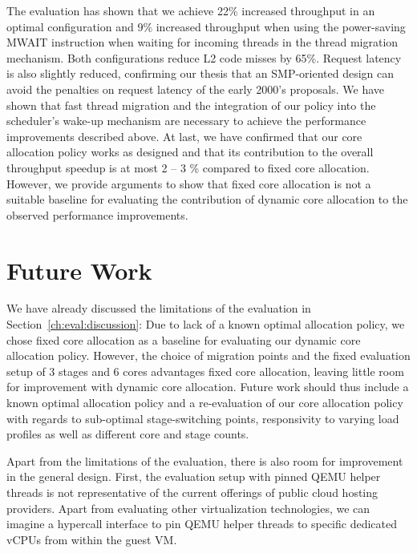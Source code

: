 \documentclass[12pt,a4paper]{book}
\begin{document}
The evaluation has shown that we achieve 22\% increased throughput in an optimal configuration and 9\% increased throughput when using the power-saving MWAIT instruction when waiting for incoming threads in the thread migration mechanism.
Both configurations reduce L2 code misses by 65\%.
Request latency is also slightly reduced, confirming our thesis that an SMP-oriented design can avoid the penalties on request latency of the early 2000's proposals.
We have shown that fast thread migration and the integration of our policy into the scheduler's wake-up mechanism are necessary to achieve the performance improvements described above.
At last, we have confirmed that our core allocation policy works as designed and that its contribution to the overall throughput speedup is at most 2 -- 3 \% compared to fixed core allocation.
However, we provide arguments to show that fixed core allocation is not a suitable baseline for evaluating the contribution of dynamic core allocation to the observed performance improvements.

\section{Future Work}\label{ch:concl:fw}

We have already discussed the limitations of the evaluation in Section~\ref{ch:eval:discussion}:
Due to lack of a known optimal allocation policy, we chose fixed core allocation as a baseline for evaluating our dynamic core allocation policy.
However, the choice of migration points and the fixed evaluation setup of $3$ stages and $6$ cores advantages fixed core allocation, leaving little room for improvement with dynamic core allocation.
Future work should thus include a known optimal allocation policy and a re-evaluation of our core allocation policy with regards to sub-optimal stage-switching points, responsivity to varying load profiles as well as different core and stage counts.

Apart from the limitations of the evaluation, there is also room for improvement in the general design.
First, the evaluation setup with pinned QEMU helper threads is not representative of the current offerings of public cloud hosting providers.
Apart from evaluating other virtualization technologies, we can imagine a hypercall interface to pin QEMU helper threads to specific dedicated vCPUs from within the guest VM.

\end{document}
